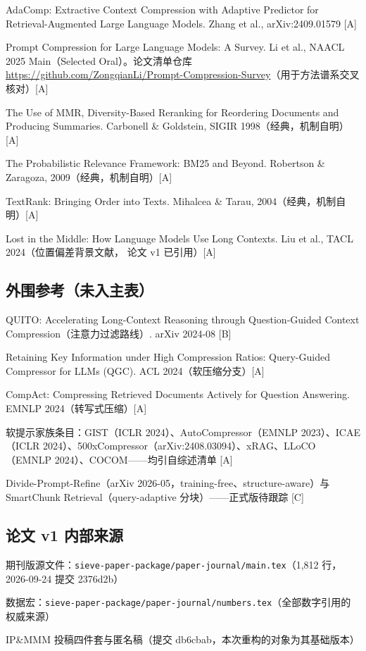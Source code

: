 \begin{enumerate}[itemsep=1pt,label={[\arabic*]}]
\item AdaComp: Extractive Context Compression with Adaptive Predictor for Retrieval-Augmented Large Language Models. Zhang et al., arXiv:2409.01579 [A]
\item Prompt Compression for Large Language Models: A Survey. Li et al., NAACL 2025 Main（Selected Oral）。论文清单仓库 \url{https://github.com/ZongqianLi/Prompt-Compression-Survey}（用于方法谱系交叉核对）[A]
\item The Use of MMR, Diversity-Based Reranking for Reordering Documents and Producing Summaries. Carbonell \& Goldstein, SIGIR 1998（经典，机制自明）[A]
\item The Probabilistic Relevance Framework: BM25 and Beyond. Robertson \& Zaragoza, 2009（经典，机制自明）[A]
\item TextRank: Bringing Order into Texts. Mihalcea \& Tarau, 2004（经典，机制自明）[A]
\item Lost in the Middle: How Language Models Use Long Contexts. Liu et al., TACL 2024（位置偏差背景文献，\sieve{} 论文 v1 已引用）[A]
\end{enumerate}

\subsection*{外围参考（未入主表）}

\begin{enumerate}[itemsep=1pt,label={[\arabic*]}]
\item QUITO: Accelerating Long-Context Reasoning through Question-Guided Context Compression（注意力过滤路线）. arXiv 2024-08 [B]
\item Retaining Key Information under High Compression Ratios: Query-Guided Compressor for LLMs (QGC). ACL 2024（软压缩分支）[A]
\item CompAct: Compressing Retrieved Documents Actively for Question Answering. EMNLP 2024（转写式压缩）[A]
\item 软提示家族条目：GIST（ICLR 2024）、AutoCompressor（EMNLP 2023）、ICAE（ICLR 2024）、500xCompressor（arXiv:2408.03094）、xRAG、LLoCO（EMNLP 2024）、COCOM——均引自综述清单 [A]
\item Divide-Prompt-Refine（arXiv 2026-05，training-free、structure-aware）与 SmartChunk Retrieval（query-adaptive 分块）——正式版待跟踪 [C]
\end{enumerate}

\subsection*{论文 v1 内部来源}

\begin{enumerate}[itemsep=1pt,label={[\arabic*]}]
\item \sieve{} 期刊版源文件：\texttt{sieve-paper-package/paper-journal/main.tex}（1{,}812 行，2026-09-24 提交 2376d2b）
\item 数据宏：\texttt{sieve-paper-package/paper-journal/numbers.tex}（全部数字引用的权威来源）
\item IP\&MMM 投稿四件套与匿名稿（提交 db6cbab，本次重构的对象为其基础版本）
\end{enumerate}
